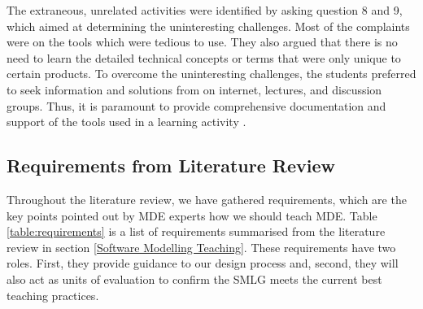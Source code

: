 \documentclass[12pt, a4paper]{report} \usepackage[titletoc]{appendix}
\begin{document}
The extraneous, unrelated activities were identified by asking question 8 and 9, which aimed at determining the uninteresting challenges. Most of the complaints were on the tools which were tedious to use. They also argued that there is no need to learn the detailed technical concepts or terms that were only unique to certain products. To overcome the uninteresting challenges, the students preferred to seek information and solutions from on internet, lectures, and discussion groups. Thus, it is paramount to provide comprehensive documentation and support of the tools used in a learning activity \cite{liebel2015ready}. 

\subsection{Requirements from Literature Review}
Throughout the literature review, we have gathered requirements, which are the key points pointed out by MDE experts how we should teach MDE. Table
\ref{table:requirements} is a list of requirements summarised from the
literature review in section \ref{Software Modelling Teaching}. These
requirements have two roles. First, they provide guidance to our design process and, second, they will also act as units of evaluation to confirm the SMLG meets the current best teaching practices.
\end{document}
